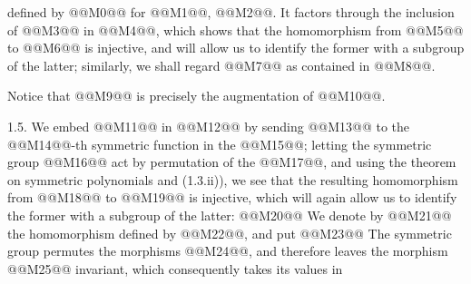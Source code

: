 defined by @@M0@@ for @@M1@@, @@M2@@. It factors through the inclusion of @@M3@@ in @@M4@@, which shows that the homomorphism from @@M5@@ to @@M6@@ is injective, and will allow us to identify the former with a subgroup of the latter; similarly, we shall regard @@M7@@ as contained in @@M8@@.

Notice that @@M9@@ is precisely the augmentation of @@M10@@.

1.5. We embed @@M11@@ in @@M12@@ by sending @@M13@@ to the @@M14@@-th symmetric function in the @@M15@@; letting the symmetric group @@M16@@ act by permutation of the @@M17@@, and using the theorem on symmetric polynomials and (1.3.ii)), we see that the resulting homomorphism from @@M18@@ to @@M19@@ is injective, which will again allow us to identify the former with a subgroup of the latter:
@@M20@@
We denote by
@@M21@@
the homomorphism defined by @@M22@@, and put
@@M23@@
The symmetric group permutes the morphisms @@M24@@, and therefore leaves the morphism @@M25@@ invariant, which consequently takes its values in

